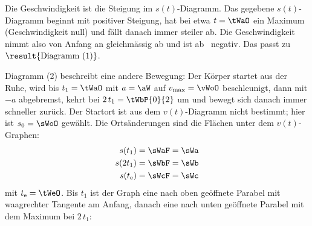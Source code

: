 Die Geschwindigkeit ist die Steigung im $s(t)$-Diagramm. Das gegebene $s(t)$-Diagramm beginnt mit positiver Steigung, hat bei etwa $t = \tWaO$ ein Maximum (Geschwindigkeit null) und fällt danach immer steiler ab. Die Geschwindigkeit nimmt also von Anfang an gleichmässig ab und ist ab \tWaO\ negativ. Das passt zu $\result{\text{Diagramm (1)}}$.

Diagramm (2) beschreibt eine andere Bewegung: Der Körper startet aus der Ruhe, wird bis $t_1 = \tWaO$ mit $a = \aW$ auf $v_\mathrm{max} = \vWoO$ beschleunigt, dann mit $-a$ abgebremst, kehrt bei $2\,t_1 = \tWbP{0}{2}$ um und bewegt sich danach immer schneller zurück. Der Startort ist aus dem $v(t)$-Diagramm nicht bestimmt; hier ist $s_0 = \sWoO$ gewählt. Die Ortsänderungen sind die Flächen unter dem $v(t)$-Graphen:
\begin{align}
 s(t_1) &= \sWaF = \sWa \\
 s(2t_1) &= \sWbF = \sWb \\
 s(t_\mathrm{e}) &= \sWcF = \sWc
\end{align}
mit $t_\mathrm{e} = \tWeO$. Bis $t_1$ ist der Graph eine nach oben geöffnete Parabel mit waagrechter Tangente am Anfang, danach eine nach unten geöffnete Parabel mit dem Maximum bei $2\,t_1$:

\begin{center}
\end{center}
